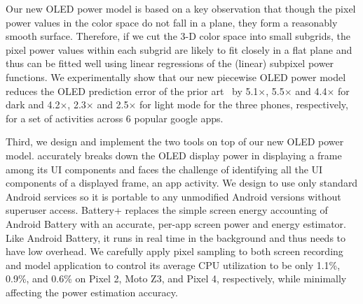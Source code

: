 Our new OLED power model is based on a key observation that though the
pixel power values in the color space do not fall in a plane,
they form a reasonably smooth surface.  Therefore, if we cut
the 3-D color space into small subgrids, the pixel power values within
each subgrid are likely to fit closely in a flat plane and thus can be
fitted well using linear regressions of the (linear) subpixel power
functions. We experimentally show that our new piecewise OLED power model reduces the
OLED prediction error of the prior art~\cite{park2015accurate} by
5.1$\times$, 5.5$\times$ and 4.4$\times$ for dark
and 4.2$\times$, 2.3$\times$ and 2.5$\times$ for light mode for the three phones,
respectively, for a set of activities across 6 popular google apps.



Third, we design and implement the two tools on top of our new OLED
power model. \name accurately breaks down the OLED display power in
displaying a frame among its UI components and faces the challenge of
identifying all the UI components of a displayed frame, \eg an app
activity.
We design \name to use only standard Android services so
it is portable to any unmodified Android versions
{without superuser access}.  Battery+ replaces
the simple screen energy accounting of Android Battery with an
accurate, per-app screen power and energy estimator.  Like Android
Battery, it runs in real time in the background and thus needs to have low
overhead. We carefully apply pixel sampling to both screen recording
and model application to control its average CPU utilization to be
only 1.1\%, 0.9\%, and 0.6\% on Pixel 2, Moto Z3, and Pixel 4, respectively,
while minimally affecting the power estimation accuracy.


